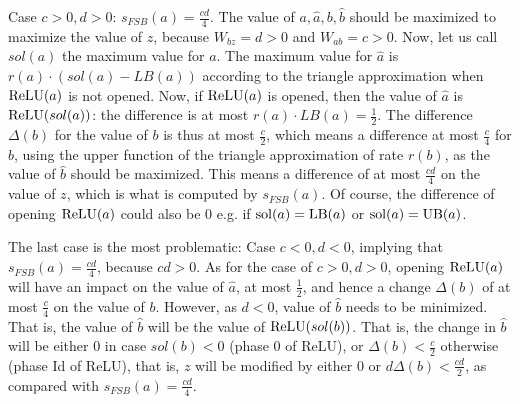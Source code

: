 Case $c>0,d>0$: $s_{FSB}(a)=\frac{cd}{4}$.
The value of $a,\hat{a},b,\hat{b}$ should be maximized to maximize the value of $z$, because $W_{bz}=d>0$ and $W_{ab}=c>0$. 
Now, let us call $sol(a)$ the maximum value for $a$.
The maximum value for $\hat{a}$ is $r(a)\cdot (sol(a)-LB(a))$ according to the triangle approximation when $\mathrm{ReLU}(a)$ is not opened. Now, if $\mathrm{ReLU}(a)$ is opened, then 
the value of $\hat{a}$ is $\mathrm{ReLU}(sol(a))$: the difference is at most $r(a) \cdot LB(a) = \frac{1}{2}$. The difference $\Delta(b)$ for the value of $b$ is thus at most $\frac{c}{2}$, which means a difference at most $\frac{c}{4}$ for $\hat{b}$, using the upper function of the triangle approximation of rate $r(b)$, as the value of $\hat{b}$ should be maximized.
This means a difference of at most $\frac{cd}{4}$ on the value of $z$, which is what is computed by $s_{FSB}(a)$. Of course, the difference of opening $\mathrm{ReLU}(a)$ could also be 0 e.g. if $\mathrm{sol}(a)=\mathrm{LB}(a)$ or $\mathrm{sol}(a)=\mathrm{UB}(a)$.

The last case is the most problematic: 
Case $c<0,d<0$, implying that $s_{FSB}(a)=\frac{cd}{4}$, because $cd >0$.
As for the case of $c>0, d>0$, opening $\mathrm{ReLU}(a)$ will have an impact on the value of $\hat{a}$,
at most $\frac{1}{2}$, and hence a change $\Delta(b)$ of at most $\frac{c}{4}$ on the value of $b$.
However, as $d<0$, value of $\hat{b}$ needs to be minimized. That is, the value of $\hat{b}$ will be the value of $\mathrm{ReLU}(sol(b))$.
That is, the change in $\hat{b}$ will be either 0 in case $sol(b)<0$ (phase 0 of ReLU),
or $\Delta(b)<\frac{c}{2}$ otherwise (phase Id of ReLU), that is, $z$ will be modified by 
either 0 or $d \Delta(b)<\frac{cd}{2}$, as compared with $s_{FSB}(a)=\frac{cd}{4}$.



